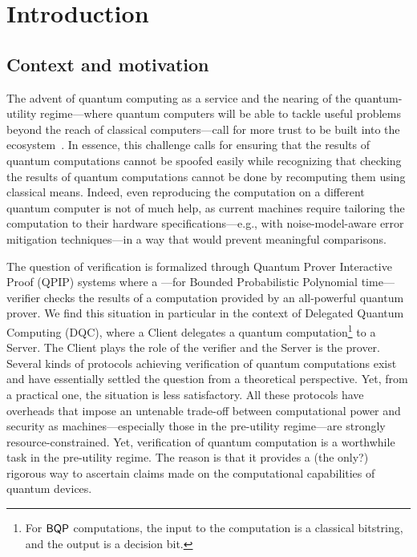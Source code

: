 \section{Introduction}
\subsection{Context and motivation}
The advent of quantum computing as a service and the nearing of the quantum-utility regime---where quantum computers will be able to tackle useful problems beyond the reach of classical computers---call for more trust to be built into the ecosystem~\cite{BKBH25grand}. In essence, this challenge calls for ensuring that the results of quantum computations cannot be spoofed easily while recognizing that checking the results of quantum computations cannot be done by recomputing them using classical means. Indeed, even reproducing the computation on a different quantum computer is not of much help, as current machines require tailoring the computation to their hardware specifications---e.g., with noise-model-aware error mitigation techniques---in a way that would prevent meaningful comparisons.

The question of verification is formalized through Quantum Prover Interactive Proof (QPIP) systems where a ---for Bounded Probabilistic Polynomial time---verifier checks the results of a  computation provided by an all-powerful quantum prover.
We find this situation in particular in the context of Delegated Quantum Computing (DQC), where a Client delegates a quantum computation\footnote{For $\textsf{BQP}$ computations, the input to the computation is a classical bitstring, and the output is a decision bit.} to a Server. The Client plays the role of the verifier and the Server is the prover.
Several kinds of protocols achieving verification of quantum computations exist \cite{ABE08interactive,ABEM17interactive,FK17unconditionally,B18how,M18classical} and have essentially settled the question from a theoretical perspective. Yet, from a practical one, the situation is less satisfactory. All these protocols have overheads that impose an untenable trade-off between computational power and security as machines---especially those in the pre-utility regime---are strongly resource-constrained. Yet, verification of quantum computation is a worthwhile task in the pre-utility regime. The reason is that it provides a (the only?) rigorous way to ascertain claims made on the computational capabilities of quantum devices.

